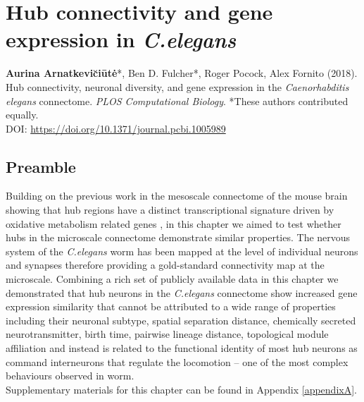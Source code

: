 \chapter{Hub connectivity and gene expression in \textit{C.elegans}}
\label{ch:Chapter2}



\textbf{Aurina Arnatkevi\u{c}i\={u}t\.{e}}*,
Ben D. Fulcher*,
Roger Pocock,
Alex Fornito (2018).
Hub connectivity, neuronal diversity, and gene expression in the \emph{Caenorhabditis elegans} connectome. \textit{PLOS Computational Biology}.
*These authors contributed equally.\\
DOI: \url{https://doi.org/10.1371/journal.pcbi.1005989} %



\section*{Preamble}
Building on the previous work in the mesoscale connectome of the mouse brain showing that hub regions have a distinct transcriptional signature driven by oxidative metabolism related genes \citep{Fulcher2016}, in this chapter we aimed to test whether hubs in the microscale connectome demonstrate similar properties. The nervous system of the \textit{C.elegans} worm has been mapped at the level of individual neurons and synapses therefore providing a gold-standard connectivity map at the microscale. Combining a rich set of publicly available data in this chapter we demonstrated that hub neurons in the \textit{C.elegans} connectome show increased gene expression similarity that cannot be attributed to a wide range of properties including their neuronal subtype, spatial separation distance, chemically secreted neurotransmitter, birth time, pairwise lineage distance, topological module affiliation and instead is related to the functional identity of most hub neurons as command interneurons that regulate the locomotion -- one of the most complex behaviours observed in worm.\\ Supplementary materials for this chapter can be found in Appendix \ref{appendixA}.


